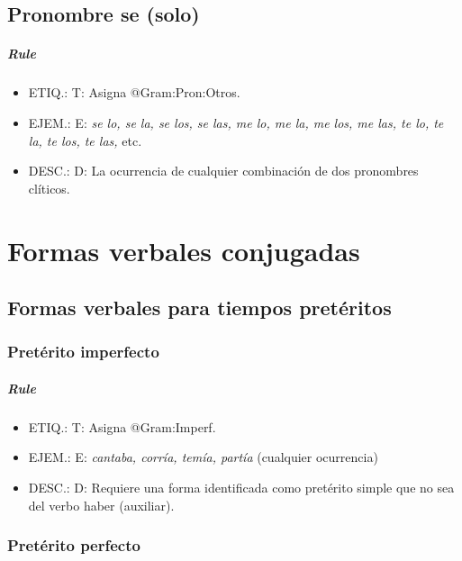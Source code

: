 \documentclass[11pt]{report}
\begin{document}
\section{Pronombre se (solo)}
\paragraph*{Rule}
\begin{itemize}
\item ETIQ.:  T: Asigna @Gram:Pron:Otros.
\item EJEM.:  E: \emph{se lo, se la, se los, se las, me lo, me la, me los, me las, te lo, te la, te los, te las,} etc.
\item DESC.:  D: La ocurrencia de cualquier combinación de dos pronombres clíticos.
\end{itemize}

\chapter{Formas verbales conjugadas}
\section{Formas verbales para tiempos pretéritos}
\subsection{Pretérito imperfecto}
\paragraph*{Rule}
\begin{itemize}
\item ETIQ.:  T: Asigna @Gram:Imperf.
\item EJEM.:  E: \emph{cantaba, corría, temía, partía} (cualquier ocurrencia)
\item DESC.:  D: Requiere una forma identificada como pretérito simple que no sea del verbo haber (auxiliar).
\end{itemize}

\subsection{Pretérito perfecto}
\end{document}

